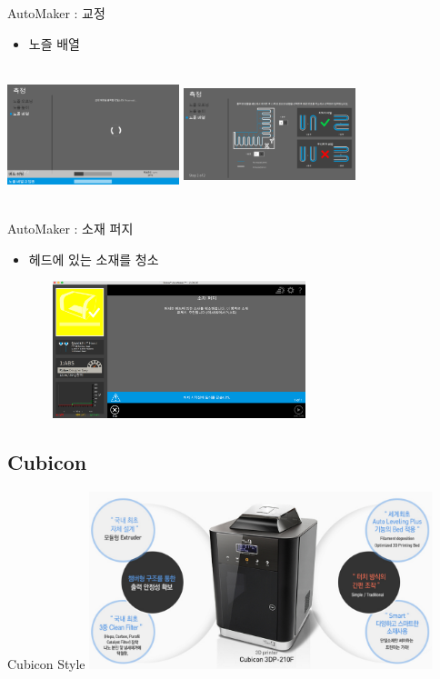 \documentclass[11pt]{beamer}
\begin{document}
\begin{frame}[t]{AutoMaker : 교정 }\footnotesize
\begin{itemize}
\item 노즐 배열
\end{itemize}
\includegraphics[width=5cm, height=4cm]{./image/17_55.png} \@ \includegraphics[width=5cm, height=4cm]{./image/17_56.png}
\end{frame}


\begin{frame}[t]{AutoMaker : 소재 퍼지 }\footnotesize
\begin{itemize}
\item 헤드에 있는 소재를 청소
\end{itemize}
\includegraphics[width=10cm, height=4cm]{./image/17_33.png}
\end{frame}




\subsection{Cubicon}

\begin{frame}[t]{Cubicon Style}\footnotesize
	\centering
	\includegraphics[width=10cm]{./image/18_05.png}
\end{frame}
\end{document}
